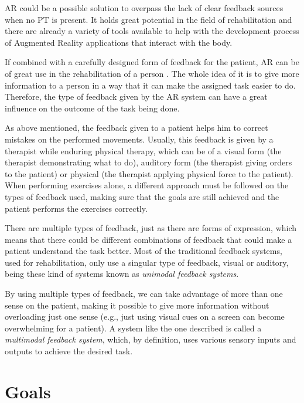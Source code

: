 \ac{AR} could be a possible solution to overpass the lack of clear feedback sources when no \ac{PT} is present.
It holds great potential in the field of rehabilitation %
and there are already a variety of tools available to help with the development process of Augmented
Reality applications that interact with the body\cite{Gama2012a}.

If combined with a carefully designed form of feedback for the patient,
\ac{AR} can be of great use in the rehabilitation of a person \cite{Sigrist2013}. The whole 
idea of it is to give more information to a person in a way that it can make 
the assigned task easier to do.
Therefore, the type of feedback given by the \ac{AR} system can have a great influence 
on the outcome of the task being done.\cite{Causo2011}

As above mentioned, the feedback given to a patient helps him to correct mistakes on the performed movements.
Usually, this feedback is given by a therapist while enduring physical therapy, which can be of a visual form (the therapist demonstrating what to do), auditory form (the therapist giving orders to the patient) or physical (the therapist applying physical force to the patient). 
When performing exercises alone, a different approach must be followed on the types of feedback used, making sure that the goals 
are still achieved and the patient performs the exercises correctly.

There are multiple types of feedback, just as there are forms of expression, which means that 
there could be different combinations of feedback that could make a patient understand the task better.
Most of the traditional feedback systems, used for rehabilitation, only use a singular type of feedback,
visual or auditory\cite{Design2005}, being these kind of systems known as \emph{unimodal feedback systems}.

By using multiple types of feedback, we can take advantage of more than one sense on the patient, 
making it possible to give more information without overloading just one sense (e.g., just using visual
cues on a screen can become overwhelming for a patient). A system like the one described is called a 
\emph{multimodal feedback system}, which, by definition, uses various sensory inputs and outputs to achieve the desired task.

\section{Goals}

